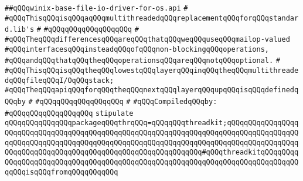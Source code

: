 \label{src/lib/std/src/io/winix-base-file-io-driver-for-os.api}
\verb|##qQQqwinix-base-file-io-driver-for-os.api|\newline
\verb|#|\newline
\verb|#qQQqThisqQQqisqQQqaqQQqmultithreadedqQQqreplacementqQQqforqQQqstandard.lib's|\newline
\verb|#|\newline
\verb|#qQQqqQQqqQQqqQQqqQQq|\newline
\verb|#|\newline
\verb|#qQQqTheqQQqdifferencesqQQqareqQQqthatqQQqweqQQquseqQQqmailop-valued|\newline
\verb|#qQQqinterfacesqQQqinsteadqQQqofqQQqnon-blockingqQQqoperations,|\newline
\verb|#qQQqandqQQqthatqQQqtheqQQqoperationsqQQqareqQQqnotqQQqoptional.|\newline
\verb|#|\newline
\verb|#qQQqThisqQQqisqQQqtheqQQqlowestqQQqlayerqQQqinqQQqtheqQQqmultithreadedqQQqfileqQQqI/OqQQqstack;|\newline
\verb|#qQQqTheqQQqapiqQQqforqQQqtheqQQqnextqQQqlayerqQQqupqQQqisqQQqdefinedqQQqby|\newline
\verb|#|\newline
\verb|#qQQqqQQqqQQqqQQqqQQq|\newline
\verb|#|\newline
\newline
\verb|#qQQqCompiledqQQqby:|\newline
\verb|#qQQqqQQqqQQqqQQqqQQq|\newline
\newline
\newline
\verb|stipulate|\newline
\verb|qQQqqQQqqQQqqQQqpackageqQQqthrqQQq=qQQqqQQqthreadkit;qQQqqQQqqQQqqQQqqQQqqQQqqQQqqQQqqQQqqQQqqQQqqQQqqQQqqQQqqQQqqQQqqQQqqQQqqQQqqQQqqQQqqQQqqQQqqQQqqQQqqQQqqQQqqQQqqQQqqQQqqQQqqQQqqQQqqQQqqQQqqQQqqQQqqQQqqQQqqQQqqQQqqQQqqQQqqQQqqQQqqQQqqQQqqQQqqQQqqQQqqQQq#qQQqthreadkitqQQqqQQqqQQqqQQqqQQqqQQqqQQqqQQqqQQqqQQqqQQqqQQqqQQqqQQqqQQqqQQqqQQqqQQqqQQqqQQqqQQqisqQQqfromqQQqqQQqqQQq|\newline
